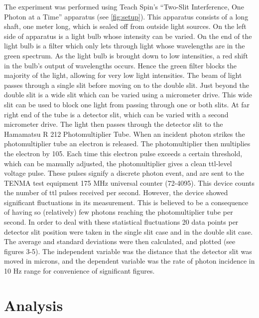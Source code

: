 \documentclass[12pt,twocolumn]{article}
\begin{document}
The experiment was performed using Teach Spin’s “Two-Slit Interference, One Photon at a Time” apparatus (see \ref{fig:setup}). This apparatus consists of a long shaft, one meter long, which is sealed off from outside light sources. On the left side of apparatus is a light bulb whose intensity can be varied. On the end of the light bulb is a filter which only lets through light whose wavelengths are in the green spectrum.   As the light bulb is brought down to low intensities, a red shift in the bulb’s output of wavelengths occurs. Hence the green filter blocks the majority of the light, allowing for very low light intensities. The beam of light passes through a single slit before moving on to the double slit. Just beyond the double slit is a wide slit which can be varied using a micrometer drive. This wide slit can be used to block one light from passing through one or both slits. At far right end of the tube is a detector slit, which can be varied with a second micrometer drive. The light then passes through the detector slit to the Hamamatsu R 212 Photomultiplier Tube. When an incident photon strikes the photomultiplier tube an electron is released. The photomultiplier then multiplies the electron by 105. Each time this electron pulse exceeds a certain threshold, which can be manually adjusted, the photomultiplier gives a clean ttl-level voltage pulse. These pulses signify a discrete photon event, and are sent to the TENMA test equipment 175 MHz universal counter (72-4095). This device counts the number of ttl pulses received per second. However, the device showed significant fluctuations in its measurement. This is believed to be a consequence of having so (relatively) few photons reaching the photomultiplier tube per second. In order to deal with these statistical fluctuations 20 data points per detector slit position were taken in the single slit case and in the double slit case. The average and standard deviations were then calculated, and plotted (see figures 3-5).  The independent variable was the distance that the detector slit was moved in microns, and the dependent variable was the rate of photon incidence in 10 Hz range for convenience of significant figures.


\section{Analysis}
\end{document}
